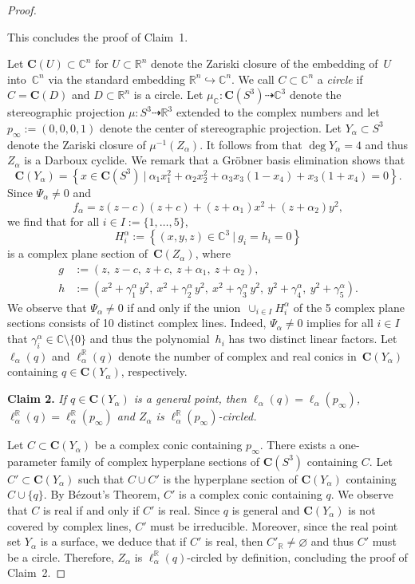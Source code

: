 \documentclass[11pt]{article}
\newenvironment{Mlist}{\begin{itemize}[topsep=0pt,itemsep=4pt,leftmargin=7mm]}{\end{itemize}}
\newcommand{\C}{\mathbb{C}}
\newcommand{\R}{\mathbb{R}}
\newcommand{\bC}{\mathbf{C}}
\renewcommand{\c}{\colon}
\newcommand{\dto}{\dasharrow}
\newcommand{\set}[2]{\left\{#1 ~|~ #2\right\}}
\newcommand{\df}{\emph}
\newcommand{\resp}{respectively}
\newcommand{\st}{such that }
\begin{document}
\begin{proof}
\begin{Mlist}
\end{Mlist}
This concludes the proof of Claim~1.

Let $\bC(U)\subset\C^n$ for $U\subset\R^n$ denote the Zariski closure of the
embedding of~$U$ into~$\C^n$ via the standard embedding $\R^n\hookrightarrow\C^n$.
We call $C\subset \C^n$ a \df{circle} if $C=\bC(D)$ and $D\subset\R^n$ is a circle.
Let $\mu_\C\c\bC(S^3)\dto \C^3$ denote the stereographic projection
$\mu\c S^3\dto \R^3$ extended to the complex numbers
and let $p_\infty:=(0,0,0,1)$ denote the center of stereographic projection.
Let $Y_\alpha\subset S^3$ denote the Zariski closure of $\mu^{-1}(Z_\alpha)$.
It follows from \citep[Proposition~5 and Theorem~1]{2021circ} that $\deg Y_\alpha=4$
and thus $Z_\alpha$ is a Darboux cyclide.
We remark that a Gr\"obner basis elimination shows that
\[
\bC(Y_\alpha)=\set{x\in\bC(S^3)}{\alpha_1 x_1^2 + \alpha_2 x_2^2  + \alpha_3x_3(1-x_4) + x_3(1 + x_4)=0}.
\]
Since $\Psi_\alpha\neq 0$ and
\[
f_\alpha=z(z-c)(z+c)+(z+\alpha_1)x^2+(z+\alpha_2)y^2,
\]
we find that for all $i\in I:=\{1,\ldots,5\}$,
\[
H^\alpha_i:=\set{(x,y,z)\in\C^3}{g_i=h_i=0}
\]
is a complex plane section of~$\bC(Z_\alpha)$, where
\begin{align*}
g&:=(z,~z-c,~z+c,~z+\alpha_1,~z+\alpha_2),
\\
h&:=\left(x^2+\gamma^\alpha_1\,y^2,~x^2+\gamma^\alpha_2\,y^2,~x^2+\gamma^\alpha_3\,y^2,~y^2+\gamma^\alpha_4,~y^2+\gamma^\alpha_5\right).
\end{align*}
We observe that $\Psi_\alpha\neq 0$
if and only if
the union~$\cup_{i\in I} H^\alpha_i$ of the 5 complex plane sections consists of 10 distinct complex lines.
Indeed, $\Psi_\alpha\neq 0$ implies for all $i\in I$ that $\gamma^\alpha_i\in\C\setminus\{0\}$
and thus the polynomial~$h_i$ has two distinct linear factors.
Let $\ell_\alpha(q)$ and $\ell_\alpha^\R(q)$ denote the number of complex and real conics
in~$\bC(Y_\alpha)$ containing $q\in \bC(Y_\alpha)$, \resp.

{\bf Claim 2.} {\it
If $q\in\bC(Y_\alpha)$ is a general point, then
$\ell_\alpha(q)=\ell_\alpha(p_\infty)$,
$\ell_\alpha^\R(q)=\ell_\alpha^\R(p_\infty)$
and $Z_\alpha$ is $\ell_\alpha^\R(p_\infty)$-circled.
}

Let $C\subset \bC(Y_\alpha)$ be a complex conic containing $p_\infty$.
There exists a one-parameter family of complex hyperplane sections of $\bC(S^3)$ containing $C$.
Let $C'\subset\bC(Y_\alpha)$ \st
$C\cup C'$ is the hyperplane section of $\bC(Y_\alpha)$ containing $C\cup\{q\}$.
By B\'ezout's Theorem, $C'$ is a complex conic containing $q$.
We observe that $C$ is real if and only if $C'$ is real.
Since $q$ is general and $\bC(Y_\alpha)$ is not covered by complex lines,
$C'$ must be irreducible. Moreover, since the real point set $Y_\alpha$ is a surface,
we deduce that if $C'$ is real, then $C'_\R\neq \varnothing$ and thus $C'$ must be a circle.
Therefore, $Z_\alpha$ is $\ell_\alpha^\R(q)$-circled by definition,
concluding the proof of Claim~2.


\end{proof}
\end{document}
